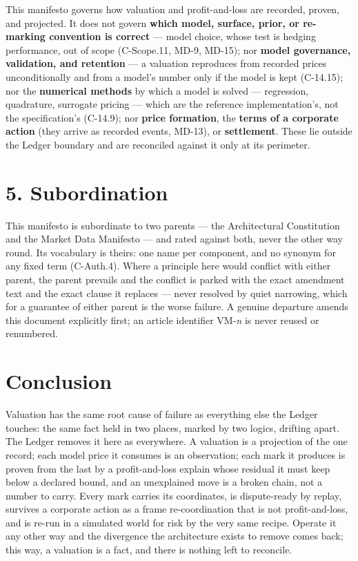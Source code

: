 \documentclass[11pt,a4paper]{article}
\begin{document}
This manifesto governs how valuation and profit-and-loss are recorded,
proven, and projected. It does not govern \textbf{which model, surface,
prior, or re-marking convention is correct} --- model choice, whose test is
hedging performance, out of scope (C-Scope.11, MD-9, MD-15); nor
\textbf{model governance, validation, and retention} --- a valuation
reproduces from recorded prices unconditionally and from a model's number
only if the model is kept (C-14.15); nor the \textbf{numerical methods} by
which a model is solved --- regression, quadrature, surrogate pricing ---
which are the reference implementation's, not the specification's (C-14.9);
nor \textbf{price formation}, the \textbf{terms of a corporate action}
(they arrive as recorded events, MD-13), or \textbf{settlement}. These lie
outside the Ledger boundary and are reconciled against it only at its
perimeter.

\section{5. Subordination}

This manifesto is subordinate to two parents --- the Architectural
Constitution and the Market Data Manifesto --- and rated against both,
never the other way round. Its vocabulary is theirs: one name per
component, and no synonym for any fixed term (C-Auth.4). Where a principle
here would conflict with either parent, the parent prevails and the
conflict is parked with the exact amendment text and the exact clause it
replaces --- never resolved by quiet narrowing, which for a guarantee of
either parent is the worse failure. A genuine departure amends this
document explicitly first; an article identifier VM-\emph{n} is never
reused or renumbered.

\section{Conclusion}

Valuation has the same root cause of failure as everything else the Ledger
touches: the same fact held in two places, marked by two logics, drifting
apart. The Ledger removes it here as everywhere. A valuation is a
projection of the one record; each model price it consumes is an
observation; each mark it produces is proven from the last by a
profit-and-loss explain whose residual it must keep below a declared
bound, and an unexplained move is a broken chain, not a number to carry.
Every mark carries its coordinates, is dispute-ready by replay, survives a
corporate action as a frame re-coordination that is not profit-and-loss,
and is re-run in a simulated world for risk by the very same recipe.
Operate it any other way and the divergence the architecture exists to
remove comes back; this way, a valuation is a fact, and there is nothing
left to reconcile.
\end{document}

